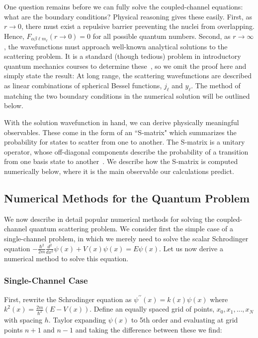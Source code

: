 \documentclass[%
 reprint,
 amsmath,amssymb,
 aps,
 nofootinbib
]{revtex4-1}
\begin{document}
One question remains before we can fully solve the coupled-channel equations: what are the boundary conditions? Physical reasoning gives these easily. First, as $r \rightarrow 0$, there must exist a repulsive barrier preventing the nuclei from overlapping. Hence, $F_{\alpha \beta \ell m_\ell}(r\rightarrow 0) = 0$ for all possible quantum numbers. Second, as $r \rightarrow \infty$, the wavefunctions must approach well-known analytical solutions to the scattering problem. It is a standard (though tedious) problem in introductory quantum mechanics courses to determine these~\cite{Krems2017,ColdChemBook}, so we omit the proof here and simply state the result: At long range, the scattering wavefunctions are described as linear combinations of spherical Bessel functions, $j_\ell$ and $y_\ell$. The method of matching the two boundary conditions in the numerical solution will be outlined below.

With the solution wavefunction in hand, we can derive physically meaningful observables. These come in the form of an ``S-matrix" which summarizes the probability for states to scatter from one to another. The S-matrix is a unitary operator, whose off-diagonal components describe the probability of a transition from one basis state to another~\cite{Krems2017,ColdMolsBook,ColdChemBook}. We describe how the S-matrix is computed numerically below, where it is the main observable our calculations predict.

\subsection{\label{sec:QuantumMethod} Numerical Methods for the Quantum Problem}
We now describe in detail popular numerical methods for solving the coupled-channel quantum scattering problem. We consider first the simple case of a single-channel problem, in which we merely need to solve the scalar Schrodinger equation $-\frac{\hbar^2}{2m} \frac{d^2}{dx^2} \psi(x) + V(x) \psi(x) = E \psi(x)$. Let us now derive a numerical method to solve this equation. 

\subsubsection{Single-Channel Case}

First, rewrite the Schrodinger equation as $\psi^{\prime\prime}(x) = k(x) \psi(x)$ where $k^2(x) = \frac{2m}{\hbar^2} (E-V(x))$. Define an equally spaced grid of points, $x_0, x_1,..., x_N$ with spacing $h$. Taylor expanding $\psi(x)$ to 5th order and evaluating at grid points $n+1$ and $n-1$ and taking the difference between these we find:
\end{document}
